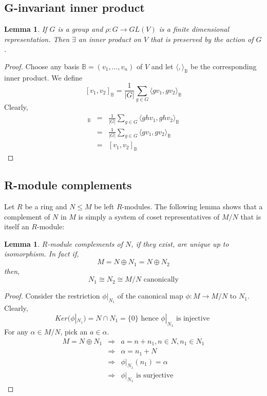\documentclass{sig-alternate}
\newtheorem{lemma}[theorem]{Lemma}
\begin{document}
\subsection{G-invariant inner product}
\begin{lemma}
If $G$ is a group and $\rho: G\rightarrow GL(V)$ is a finite dimensional representation. Then $\exists$ an inner product on $V$ that is preserved by the action of $G$.
\end{lemma}
\begin{proof}
Choose any basis $\mathbb{B} = (v_1, \ldots, v_n)$ of $V$ and let $\langle,\rangle_{\mathbb{B}}$ be the corresponding inner product. We define
\[ [v_1, v_2]_{\mathbb{B}} = \frac{1}{|G|}\sum_{g \in G} \langle gv_1, gv_2\rangle_{\mathbb{B}}\]
Clearly,
\begin{eqnarray*}
[hv_1, hv_2]_{\mathbb{B}} & = & \frac{1}{|G|}\sum_{g \in G} \langle ghv_1, ghv_2\rangle_{\mathbb{B}} \\
& = &\frac{1}{|G|}\sum_{g \in G} \langle gv_1, gv_2\rangle_{\mathbb{B}} \\
& = & [v_1, v_2]_{\mathbb{B}}
\end{eqnarray*}
\end{proof}

\subsection{R-module complements}
Let $R$ be a ring and $N\leq M$ be left $R$-modules. The following lemma shows that a complement of $N$ in $M$ is simply a system of coset representatives of $M/N$ that is itself an $R$-module:
\begin{lemma}
$R$-module complements of $N$, if they exist, are unique up to isomorphism. In fact if,
\[ M = N \oplus N_1 = N \oplus N_2 \]
then,
\[N_1 \cong N_2 \cong M/N \mbox{ canonically} \]
\end{lemma}
\begin{proof}
Consider the restriction $\phi |_{N_1}$ of the canonical map $\phi :M\rightarrow M/N$ to $N_1$. Clearly,
\[Ker(\phi |_{N_1}) = N\cap N_1 = \{0\}  \mbox { hence } \phi |_{N_1} \mbox{ is injective } \]
For any $\alpha \in M/N$, pick an $a\in\alpha$.
\begin{eqnarray*} 
M = N \oplus N_1 & \Longrightarrow & a = n + n_1, n\in N, n_1\in N_1 \\
 & \Longrightarrow  & \alpha = n_1 + N \\
& \Longrightarrow & \phi |_{N_1}(n_1) = \alpha \\
& \Longrightarrow & \phi |_{N_1} \mbox{ is surjective}
\end{eqnarray*} 
\end{proof}
\end{document}
